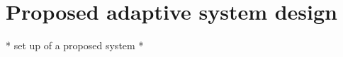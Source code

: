 
\section{Proposed adaptive system design}
\label{sec:proposition}

* set up of a proposed system *
